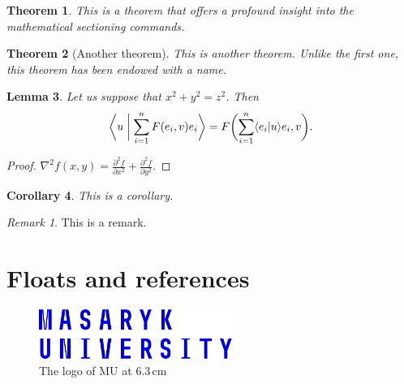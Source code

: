 \documentclass[
  digital,     %
  oneside,     %
  nosansbold,  %
  colorbold, %
  lof,         %
  lot,         %
]{fithesis4}
\begin{document}
\newtheorem{theorem}{Theorem}[section] %
\newtheorem{lemma}[theorem]{Lemma}         %
\newtheorem{corollary}[theorem]{Corollary} %
\theoremstyle{definition}
\newtheorem{definition}{Definition}
\theoremstyle{remark}
\newtheorem*{remark}{Remark}

\begin{theorem}
  This is a theorem that offers a profound insight into the
  mathematical sectioning commands.
\end{theorem}
\begin{theorem}[Another theorem]
  This is another theorem. Unlike the first one, this theorem has
  been endowed with a name.
\end{theorem}
\begin{lemma}
  Let us suppose that $x^2+y^2=z^2$. Then
  \begin{equation}
    \biggl\langle u\biggm|\sum_{i=1}^nF(e_i,v)e_i\biggr\rangle
    =F\biggl(\sum_{i=1}^n\langle e_i|u\rangle e_i,v\biggr).
  \end{equation}
\end{lemma}
\begin{proof}
  $\nabla^2 f(x,y)=\frac{\partial^2f}{\partial x^2}+
   \frac{\partial^2f}{\partial y^2}$.
\end{proof}
\begin{corollary}
  This is a corollary.
\end{corollary}
\begin{remark}
  This is a remark.
\end{remark}

\chapter{Floats and references}
\begin{figure}
  \begin{center}
    \includegraphics[width=6.3cm]{fithesis/logo/mu/fithesis-base-english-color}
  \end{center}
  \caption{The logo of \acrlong{MU} at 6.3\,cm}
  \label{fig:mulogo1}
\end{figure}
\end{document}
